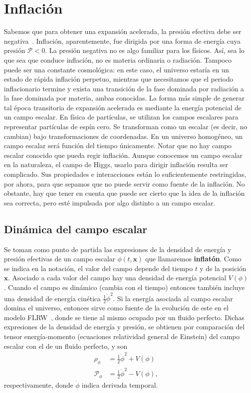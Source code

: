 \section{Inflación}
Sabemos que para obtener una expansión acelerada, la presión efectiva debe ser negativa~\cite{dodelson2020modern}. Inflación, aparentemente, fue dirigida por una forma de energía cuya presión \(\mathcal{P}<0\). La presión negativa no es algo familiar para los físicos. Así, sea lo que sea que conduce inflación, no es materia ordinaria o radiación. Tampoco puede ser una constante cosmológica: en este caso, el universo estaría en un estado de rápida inflación perpetuo, mientras que necesitamos que el periodo inflacionario termine y exista una transición de la fase dominada por radiación a la fase dominada por materia, ambas conocidas.
\newpage
La forma más simple de generar tal época transitoria de expansión acelerada es mediante la energía potencial de un campo escalar. En física de partículas, se utilizan los campos escalares para representar partículas de espín cero. Se transforman como un escalar (es decir, no cambian) bajo transformaciones de coordenadas. En un universo homogéneo, un campo escalar será función del tiempo únicamente. Notar que no hay campo escalar conocido que pueda regir inflación. Aunque conocemos un campo escalar en la naturaleza, el campo de Higgs, usarlo para dirigir inflación resulta ser complicado. Sus propiedades e interacciones están lo suficientemente restringidas, por ahora, para que sepamos que no puede servir como fuente de la inflación. No obstante, hay que tener en cuenta que puede ser cierto que la idea de la inflación sea correcta, pero esté impulsada por algo distinto a un campo escalar.
\subsection{Dinámica del campo escalar}
Se toman como punto de partida las expresiones de la densidad de energía y presión efectivas de un campo escalar \(\phi\left(t,\symbf{x}\right)\) que llamaremos \textbf{inflatón}. Como se indica en la notación, el valor del campo depende del tiempo \(t\) y de la posición \(\symbf{x}\). Asociado a cada valor del campo hay una densidad de energía potencial \(V(\phi)\). Cuando el campo es dinámico (cambia con el tiempo) entonces también incluye una densidad de energía cinética \(\frac{1}{2}\dot{\phi}^2\). Si la energía asociada al campo escalar domina el universo, entonces sirve como fuente de la evolución de este en el modelo FLRW~\cite{baumann2022cosmology}, donde se tiene al mismo ocupado por un fluido perfecto. Dichas expresiones de la densidad de energía y presión, se obtienen por comparación del tensor energía-momento (ecuaciones relatividad general de Einstein) del campo escalar con el de un fluido perfecto, y son
\begin{subequations}
    \begin{align}
        \rho_\phi&=\frac{1}{2}\dot{\phi}^2+V(\phi)\\
        \mathcal{P}_\phi&=\frac{1}{2}\dot{\phi}^2-V(\phi),
    \end{align}
    \label{eq::eqscampo}
\end{subequations}
respectivamente, donde \(\dot{\phi}\) indica derivada temporal.

